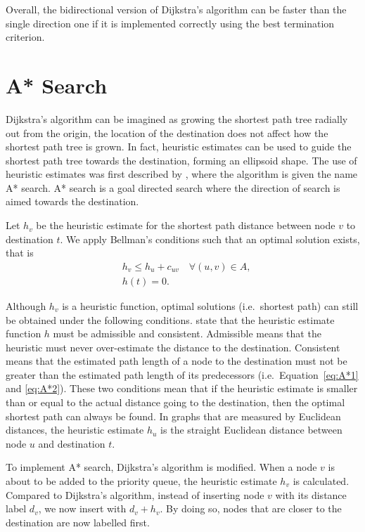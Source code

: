 Overall, the bidirectional version of Dijkstra's algorithm can be faster than the single direction one if it is implemented correctly using the best termination criterion.

\section{A* Search}\label{section:A*}
Dijkstra's algorithm can be imagined as growing the shortest path tree radially out from the origin,
the location of the destination does not affect how the shortest path tree is grown.
In fact, heuristic estimates can be used to guide the shortest path tree towards the destination,
forming an ellipsoid shape.
The use of heuristic estimates was first described by \citet{Astar},
where the algorithm is given the name A* search.
A* search is a goal directed search where the direction of search is aimed towards the destination.


Let $h_v$ be the heuristic estimate for the shortest path distance between node $v$ to destination $t$.
We apply Bellman's conditions such that an optimal solution exists, that is 
\begin{align}
    &h_v \leq h_u + c_{uv} \quad \forall(u,v) \in A, \label{eq:A*1}\\
    &h(t) = 0. \label{eq:A*2}
\end{align}

Although $h_v$ is a heuristic function,
optimal solutions (i.e.\ shortest path) can still be obtained under the following conditions.
\citet{Astar} state that the heuristic estimate function $h$ must be admissible and consistent.
Admissible means that the heuristic must never over-estimate the distance to the destination.
Consistent means that the estimated path length of a node to the destination must not be greater than the estimated path length of its predecessors (i.e.\ Equation~\eqref{eq:A*1} and \eqref{eq:A*2}).
These two conditions mean that 
if the heuristic estimate is smaller than or equal to the actual distance going to the destination,
then the optimal shortest path can always be found. 
In graphs that are measured by Euclidean distances,
the heuristic estimate $h_u$ is the straight Euclidean distance between node $u$ and destination $t$.

%
To implement A* search,
Dijkstra's algorithm is modified.
When a node $v$ is about to be added to the priority queue,
the heuristic estimate $h_v$ is calculated.
Compared to Dijkstra's algorithm,
instead of inserting node $v$ with its distance label $d_v$,
we now insert with $d_v + h_v$.
By doing so,
nodes that are closer to the destination are now labelled first.

